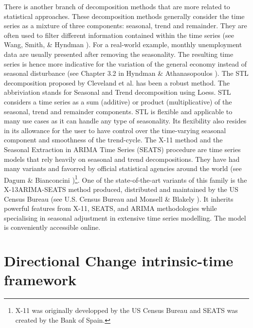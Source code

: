 There is another branch of decomposition methods that are more related to statistical approaches. These decomposition methods generally consider the time series as a mixture of three components: seasonal, trend and remainder. They are often used to filter different information contained within the time series (see Wang, Smith, \& Hyndman \citeyear{wang2006characteristic}). For a real-world example, monthly unemployment data are usually presented after removing the seasonality. The resulting time series is hence more indicative for the variation of the general economy instead of seasonal disturbance (see Chapter 3.2 in Hyndman \& Athanasopoulos \citeyear{forecastingprincipleandpractice}). The STL decomposition proposed by Cleveland et al. \citeyear{cleveland1990stl} has been a robust method. The abbriviation stands for Seasonal and Trend decomposition using Loess. STL considers a time series as a sum (additive) or product (multiplicative) of the seasonal, trend and remainder components. STL is flexible and applicable to many use cases as it can handle any type of seasonality. Its flexibility also resides in its allowance for the user to have control over the time-varying seasonal component and smoothness of the trend-cycle. The X-11 method and the Seasonal Extraction in ARIMA Time Series (SEATS) procedure are time series models that rely heavily on seasonal and trend decompositions. They have had many variants and favorred by official statistical agencies around the world (see Dagum \& Bianconcini \citeyear{dagum2016seasonal})\footnote{X-11 was originally developped by the US Census Bureau and SEATS was created by the Bank of Spain.}. One of the state-of-the-art variants of this family is the X-13ARIMA-SEATS method produced, distributed and maintained by the US Census Bureau (see U.S. Census Bureau \citeyear{x13arimaseatsmanual} and Monsell \& Blakely \citeyear{monsell2013x}). It inherits powerful features from X-11, SEATS, and ARIMA methodologies while specialising in seasonal adjustment in extensive time series modelling. The model is conveniently accessible online\footnotemark{}.

\section{Directional Change intrinsic-time framework}\label{sec: DC}


